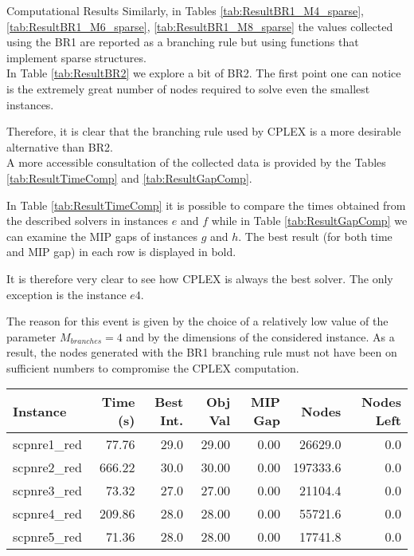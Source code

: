 \documentclass[a4paper,12pt]{mydeitesi_eng}
\begin{document}
\begin{chapter}{Computational Results}
Similarly, in Tables \ref{tab:ResultBR1_M4_sparse}, \ref{tab:ResultBR1_M6_sparse}, \ref{tab:ResultBR1_M8_sparse} the values collected using the BR1 are reported as a branching rule but using functions that implement sparse structures.\\

In Table \ref{tab:ResultBR2} we explore a bit of BR2.
The first point one can notice is the extremely great number of nodes required to solve even the smallest instances.

Therefore, it is clear that the branching rule used by CPLEX is a more desirable alternative than BR2.\\

A more accessible consultation of the collected data is provided by the Tables \ref{tab:ResultTimeComp} and \ref{tab:ResultGapComp}.

In Table \ref{tab:ResultTimeComp} it is possible to compare the times obtained from the described solvers in instances $e$ and $f$ while in Table \ref{tab:ResultGapComp} we can examine the MIP gaps of instances $g$ and $h$.
The best result (for both time and MIP gap) in each row is displayed in bold.

It is therefore very clear to see how CPLEX is always the best solver.
The only exception is the instance $e4$.

The reason for this event is given by the choice of a relatively low value of the parameter $M_{branches} = 4$ and by the dimensions of the considered instance.
As a result, the nodes generated with the BR1 branching rule must not have been on sufficient numbers to compromise the CPLEX computation.


\begin{table}[h]
\begin{center}
\begin{tabular}{l|r|r|r|r|r|r}
\textbf{Instance} & \textbf{Time (s)} & \textbf{Best Int.} & \textbf{Obj Val} & \textbf{MIP Gap} & \textbf{Nodes} & \textbf{Nodes Left}\\
\hline
scpnre1\_red & 77.76 & 29.0 & 29.00 & 0.00 & 26629.0 & 0.0 \\ 
scpnre2\_red & 666.22 & 30.0 & 30.00 & 0.00 & 197333.6 & 0.0 \\ 
scpnre3\_red & 73.32 & 27.0 & 27.00 & 0.00 & 21104.4 & 0.0 \\ 
scpnre4\_red & 209.86 & 28.0 & 28.00 & 0.00 & 55721.6 & 0.0 \\ 
scpnre5\_red & 71.36 & 28.0 & 28.00 & 0.00 & 17741.8 & 0.0 \\ 
\hline


\end{tabular}
\end{center}
\end{table}
\end{chapter}
\end{document}
